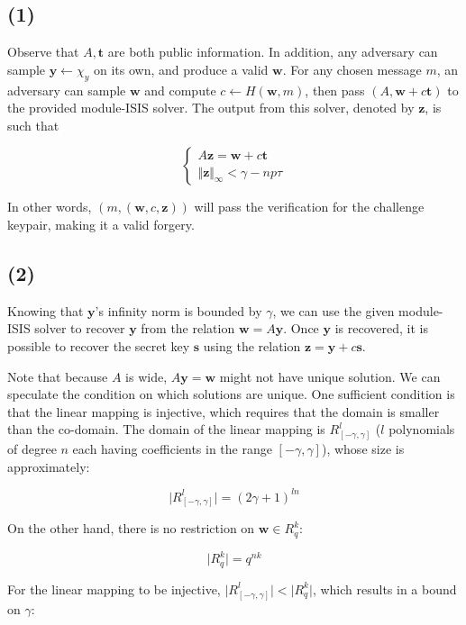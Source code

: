 \documentclass{article}
\newcommand{\norm}[1]{\Vert {#1} \Vert}
\begin{document}
\subsection*{(1)}
Observe that $A, \mathbf{t}$ are both public information. In addition, any adversary can sample $\mathbf{y} \leftarrow \chi_y$ on its own, and produce a valid $\mathbf{w}$. For any chosen message $m$, an adversary can sample $\mathbf{w}$  and compute $c \leftarrow H(\mathbf{w}, m)$, then pass $(A, \mathbf{w} + c \mathbf{t})$ to the provided module-ISIS solver. The output from this solver, denoted by $\mathbf{z}$, is such that

$$
\begin{cases}
    A\mathbf{z} = \mathbf{w} + c\mathbf{t} \\
    \norm{\mathbf{z}}_\infty < \gamma - np\tau
\end{cases}
$$

In other words, $(m, (\mathbf{w}, c, \mathbf{z}))$ will pass the verification for the challenge keypair, making it a valid forgery.

\subsection*{(2)}
Knowing that $\mathbf{y}$'s infinity norm is bounded by $\gamma$, we can use the given module-ISIS solver to recover $\mathbf{y}$ from the relation $\mathbf{w} = A \mathbf{y}$. Once $\mathbf{y}$ is recovered, it is possible to recover the secret key $\mathbf{s}$ using the relation $\mathbf{z} = \mathbf{y} + c \mathbf{s}$.

Note that because $A$ is wide, $A\mathbf{y} = \mathbf{w}$ might not have unique solution. We can speculate the condition on which solutions are unique. One sufficient condition is that the linear mapping is injective, which requires that the domain is smaller than the co-domain. The domain of the linear mapping is $R_{[-\gamma, \gamma]}^l$ ($l$ polynomials of degree $n$ each having coefficients in the range $[-\gamma, \gamma]$), whose size is approximately:

$$
\vert R_{[-\gamma, \gamma]}^l \vert = (2\gamma + 1)^{ln}
$$

On the other hand, there is no restriction on $\mathbf{w} \in R_q^k$:

$$
\vert R_q^k \vert = q^{nk}
$$

For the linear mapping to be injective, $\vert R_{[-\gamma, \gamma]}^l \vert < \vert R_q^k \vert$, which results in a bound on $\gamma$:
\end{document}
